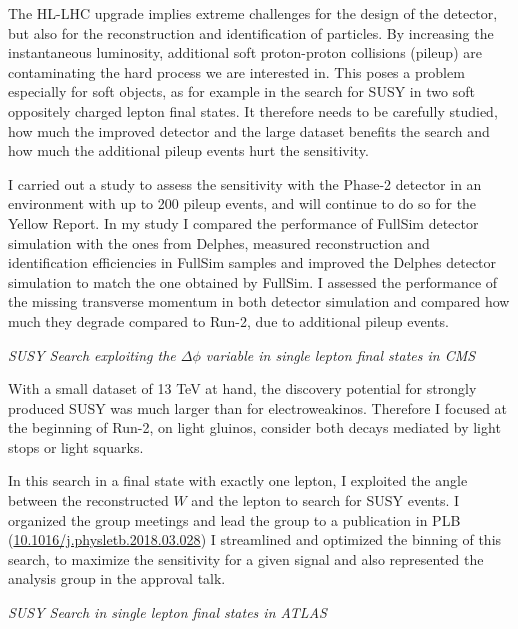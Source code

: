 \documentclass[]{cv} %
\begin{document}
\begin{researchexperience}
The HL-LHC upgrade implies extreme challenges for the design of the detector,
but also for the reconstruction and identification of particles. By increasing
the instantaneous luminosity, additional soft proton-proton collisions (pileup)
are contaminating the hard process we are interested in. This poses a problem
especially for soft objects, as for example in the search for SUSY in two soft
oppositely charged lepton final states. It therefore needs to be carefully
studied, how much the improved detector and the large dataset benefits the
search and how much the additional pileup events hurt the sensitivity.

I carried out a study to assess the sensitivity with the Phase-2 detector in an
environment with up to 200 pileup events, and will continue to do so for the
Yellow Report. In my study I compared the performance of FullSim detector
simulation with the ones from Delphes, measured reconstruction and
identification efficiencies in FullSim samples and improved the Delphes detector
simulation to match the one obtained by FullSim. I assessed the performance of
the missing transverse momentum in both detector simulation and compared how
much they degrade compared to Run-2, due to additional pileup events.

\vspace{15pt}
\Large{}
\textit{SUSY Search exploiting the $\Delta \phi$ variable in single lepton final states in CMS} \\
\normalsize{}

With a small dataset of 13 TeV at hand, the discovery potential for strongly
produced SUSY was much larger than for electroweakinos. Therefore I focused at
the beginning of Run-2, on light gluinos, consider both decays mediated by light
stops or light squarks.

In this search in a final state with exactly one lepton, I exploited the angle
between the reconstructed $W$ and the lepton to search for SUSY events. I
organized the group meetings and lead the group to a publication in PLB
(\href{http://dx.doi.org/10.1016/j.physletb.2018.03.028}{10.1016/j.physletb.2018.03.028})
I streamlined and optimized the binning of this search, to maximize the
sensitivity for a given signal and also represented the analysis group in the
approval talk.

\vspace{15pt}
\Large{}
\textit{SUSY Search in single lepton final states in ATLAS} \\
\normalsize{}


\end{researchexperience}
\end{document}
